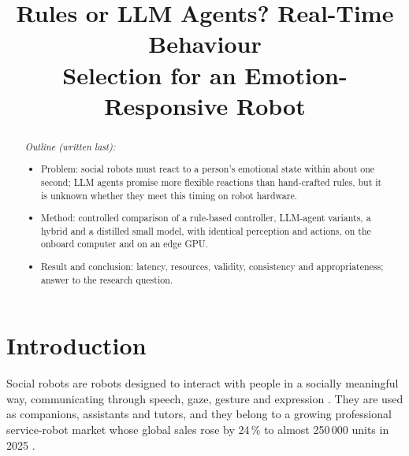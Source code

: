 \documentclass[conference]{IEEEtran}
\begin{document}
\newenvironment{points}{\begin{itemize}\setlength{\itemsep}{1pt}\setlength{\parskip}{0pt}}{\end{itemize}}


\title{Rules or LLM Agents? Real-Time Behaviour\\ Selection for an Emotion-Responsive Robot}

\author{
\and
{}
}

\maketitle

\begin{abstract}
\textit{Outline (written last):}
\begin{points}
    \item Problem: social robots must react to a person's emotional state within about one second; LLM agents promise more flexible reactions than hand-crafted rules, but it is unknown whether they meet this timing on robot hardware.
    \item Method: controlled comparison of a rule-based controller, LLM-agent variants, a hybrid and a distilled small model, with identical perception and actions, on the onboard computer and on an edge GPU.
    \item Result and conclusion: latency, resources, validity, consistency and appropriateness; answer to the research question.
\end{points}
\end{abstract}

\section{Introduction}

Social robots are robots designed to interact with people in a socially
meaningful way, communicating through speech, gaze, gesture and
expression \cite{Fong2003Survey}. They are used as companions, assistants
and tutors, and they belong to a growing professional service-robot market
whose global sales rose by 24\,\% to almost 250\,000 units in 2025
\cite{IFR2026Service}.
\end{document}
